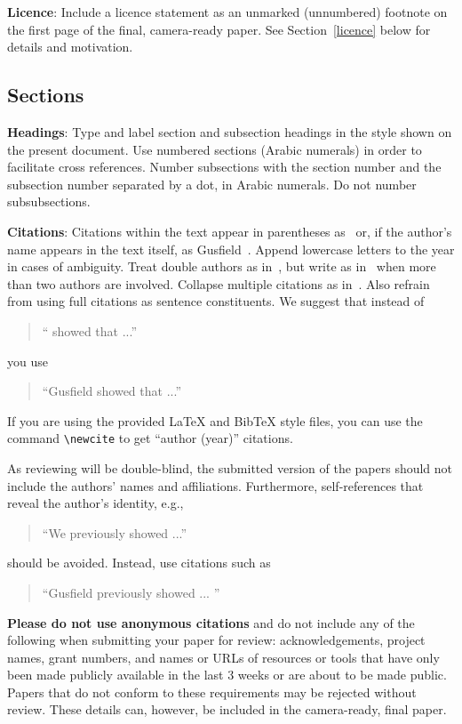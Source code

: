 \documentclass[11pt]{article}
\begin{document}
{\bf Licence}: Include a licence statement as an unmarked (unnumbered)
footnote on the first page of the final, camera-ready paper.
See Section~\ref{licence} below for details and motivation.


\subsection{Sections}

{\bf Headings}: Type and label section and subsection headings in the
style shown on the present document.  Use numbered sections (Arabic
numerals) in order to facilitate cross references. Number subsections
with the section number and the subsection number separated by a dot,
in Arabic numerals. Do not number subsubsections.

{\bf Citations}: Citations within the text appear in parentheses
as~\cite{Gusfield:97} or, if the author's name appears in the text
itself, as Gusfield~.  Append lowercase letters
to the year in cases of ambiguity.  Treat double authors as
in~\cite{Aho:72}, but write as in~\cite{Chandra:81} when more than two
authors are involved. Collapse multiple citations as
in~\cite{Gusfield:97,Aho:72}. Also refrain from using full citations
as sentence constituents. We suggest that instead of
\begin{quote}
  ``\cite{Gusfield:97} showed that ...''
\end{quote}
you use
\begin{quote}
``Gusfield    showed that ...''
\end{quote}

If you are using the provided \LaTeX{} and Bib\TeX{} style files, you
can use the command \verb|\newcite| to get ``author (year)'' citations.

As reviewing will be double-blind, the submitted version of the papers
should not include the authors' names and affiliations. Furthermore,
self-references that reveal the author's identity, e.g.,
\begin{quote}
``We previously showed \cite{Gusfield:97} ...''  
\end{quote}
should be avoided. Instead, use citations such as 
\begin{quote}
``Gusfield 
previously showed ... ''
\end{quote}

\textbf{Please do not use anonymous citations} and do not include
any of the following when submitting your paper for review:
acknowledgements, project names, grant numbers, and names or URLs of
resources or tools that have only been made publicly available in
the last 3 weeks or are about to be made public.
Papers that do not
conform to these requirements may be rejected without review.
These details can, however, be included in the camera-ready, final paper.
\end{document}
